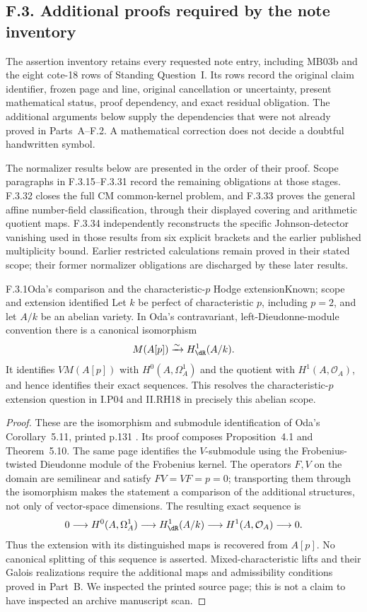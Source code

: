\subsection{F.3. Additional proofs required by the note inventory}

The assertion inventory retains every requested note entry, including MB03b and the eight cote-18 rows of Standing Question~I. Its rows record the original claim identifier, frozen page and line, original cancellation or uncertainty, present mathematical status, proof dependency, and exact residual obligation. The additional arguments below supply the dependencies that were not already proved in Parts~A--F.2. A mathematical correction does not decide a doubtful handwritten symbol.

The normalizer results below are presented in the order of their proof. Scope paragraphs in F.3.15--F.3.31 record the remaining obligations at those stages. F.3.32 closes the full CM common-kernel problem, and F.3.33 proves the general affine number-field classification, through their displayed covering and arithmetic quotient maps. F.3.34 independently reconstructs the specific Johnson-detector vanishing used in those results from six explicit brackets and the earlier published multiplicity bound. Earlier restricted calculations remain proved in their stated scope; their former normalizer obligations are discharged by these later results.

\begin{result}{F.3.1}{Oda's comparison and the characteristic-$p$ Hodge extension}{Known; scope and extension identified}
Let $k$ be perfect of characteristic $p$, including $p=2$, and let $A/k$ be an abelian variety. In Oda's contravariant, left-Dieudonne-module convention there is a canonical isomorphism
\[
 M(A[p])\xrightarrow{\sim}H^1_{\dR}(A/k).
\]
It identifies $VM(A[p])$ with $H^0(A,\Omega_A^1)$ and the quotient with $H^1(A,\mathcal O_A)$, and hence identifies their exact sequences. This resolves the characteristic-$p$ extension question in I.P04 and II.RH18 in precisely this abelian scope.
\end{result}
\begin{proof}
These are the isomorphism and submodule identification of Oda's Corollary~5.11, printed p.131 \cite{AuditOda1969}. Its proof composes Proposition~4.1 and Theorem~5.10. The same page identifies the $V$-submodule using the Frobenius-twisted Dieudonne module of the Frobenius kernel. The operators $F,V$ on the domain are semilinear and satisfy $FV=VF=p=0$; transporting them through the isomorphism makes the statement a comparison of the additional structures, not only of vector-space dimensions. The resulting exact sequence is
\[
0\longrightarrow H^0(A,\Omega_A^1)\longrightarrow H^1_{\dR}(A/k)
\longrightarrow H^1(A,\mathcal O_A)\longrightarrow0.
\]
Thus the extension with its distinguished maps is recovered from $A[p]$. No canonical splitting of this sequence is asserted. Mixed-characteristic lifts and their Galois realizations require the additional maps and admissibility conditions proved in Part~B. We inspected the printed source page; this is not a claim to have inspected an archive manuscript scan.
\end{proof}

